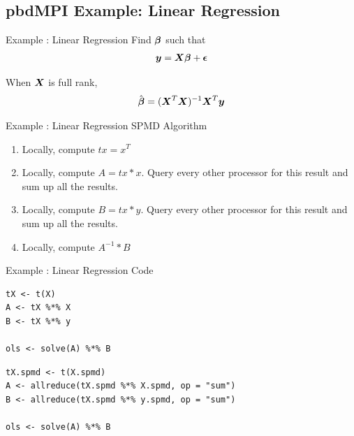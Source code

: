 \subsection{pbdMPI Example: Linear Regression}

\begin{frame}
  \begin{block}{Example \countex :  Linear Regression}\pause
      Find $\boldsymbol{\beta}$ such that
      \begin{align*}
      \boldsymbol{y} = \boldsymbol{X}\boldsymbol{\beta} + \boldsymbol{\epsilon}
      \end{align*}

      When $\boldsymbol{X}$ is full rank,
      \begin{align*}
      \hat{\boldsymbol{\beta}} = (\boldsymbol{X}^T\boldsymbol{X})^{-1}\boldsymbol{X}^T\boldsymbol{y} \label{math:ols}
      \end{align*}
  \end{block}
\end{frame}


\begin{frame}
  \begin{block}{Example \showex :  Linear Regression SPMD Algorithm}\pause
    \begin{enumerate}
     \item Locally, compute $tx = x^T$
     \item Locally, compute $A = tx * x$. Query every other processor for this result and sum up all the results.
     \item Locally, compute $B = tx * y$.  Query every other processor for this result and sum up all the results.
     \item Locally, compute $A^{-1} * B$
    \end{enumerate}
  \end{block}
\end{frame}


\begin{frame}
  \begin{exampleblock}{Example \showex :  Linear Regression Code}\pause
\begin{lstlisting}[title=Serial Code]
tX <- t(X)
A <- tX %*% X
B <- tX %*% y

ols <- solve(A) %*% B
\end{lstlisting}
  
\begin{lstlisting}[title=Parallel Code]
tX.spmd <- t(X.spmd)
A <- allreduce(tX.spmd %*% X.spmd, op = "sum")
B <- allreduce(tX.spmd %*% y.spmd, op = "sum")

ols <- solve(A) %*% B
\end{lstlisting}
  \end{exampleblock}
\end{frame}